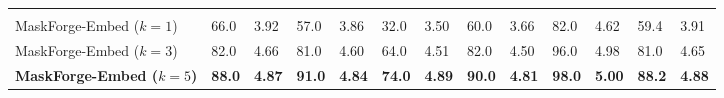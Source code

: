 \begin{table}[htb]
{\begin{tabular}{C{3.0cm}|*{12}{C{0.8cm}}}
\midrule
{}
 \\

MaskForge-Embed ($k{=}1$)         & 66.0 & 3.92 & 57.0 & 3.86 & 32.0 & 3.50 & 60.0 & 3.66 & 82.0 & 4.62 & 59.4 & 3.91 \\
MaskForge-Embed ($k{=}3$)         & 82.0 & 4.66 & 81.0 & 4.60 & 64.0 & 4.51 & 82.0 & 4.50 & 96.0 & 4.98 & 81.0 & 4.65 \\
\textbf{MaskForge-Embed ($k{=}5$)} & \textbf{88.0} & \textbf{4.87} & \textbf{91.0} & \textbf{4.84} & \textbf{74.0} & \textbf{4.89} & \textbf{90.0} & \textbf{4.81} & \textbf{98.0} & \textbf{5.00} & \textbf{88.2} & \textbf{4.88} \\

\bottomrule
\end{tabular}}
\end{table}
